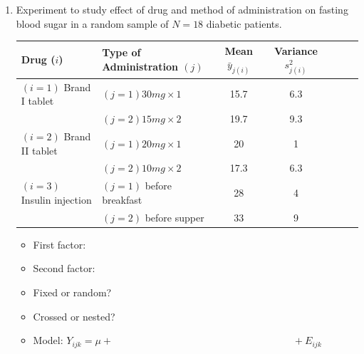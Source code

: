 \begin{enumerate}
\item Experiment to study effect of drug and method of administration on fasting blood sugar in a random sample of $N=18$ diabetic patients.
\begin{large}
\begin{center}
\begin{tabular}{llccccc}
Drug ($i$) & Type of Administration $(j)$ & Mean $\bar{y}_{j(i)}$ & Variance $s_{j(i)}^2$ \\ \hline
$(i=1)$ Brand I tablet & $(j=1)30 mg \times 1$ & 15.7 & 6.3 \\
& $(j=2)15 mg \times 2$ & 19.7 & 9.3 \\
$(i=2)$ Brand II tablet & $(j=1)20 mg \times 1$ & 20 & 1 \\
& $(j=2)10 mg \times 2$ & 17.3 & 6.3 \\
$(i=3)$ Insulin injection & $(j=1)$ before breakfast  & 28  & 4 \\
& $(j=2)$ before supper & 33 & 9 \\ \hline
\end{tabular}
\end{center}
\end{large}

\begin{itemize}
\item First factor:
\item Second factor:
\item Fixed or random?
\item Crossed or nested?
\item Model: $Y_{ijk} = \mu + \hspace{3in} + E_{ijk}$
\end{itemize}


\end{enumerate}
